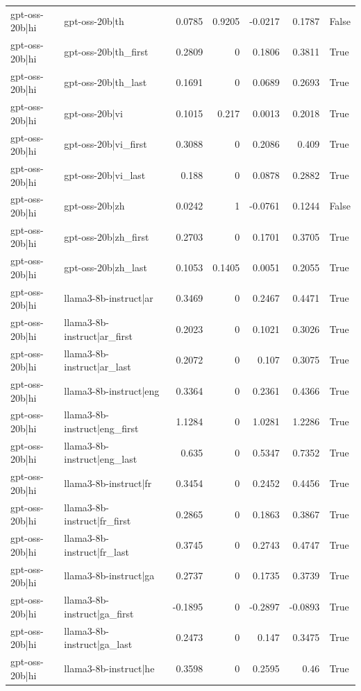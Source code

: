 \begin{table}
\begin{tabular}{l l r r r r l}
gpt-oss-20b|hi & gpt-oss-20b|th & 0.0785 & 0.9205 & -0.0217 & 0.1787 & False \\
gpt-oss-20b|hi & gpt-oss-20b|th_first & 0.2809 & 0 & 0.1806 & 0.3811 & True \\
gpt-oss-20b|hi & gpt-oss-20b|th_last & 0.1691 & 0 & 0.0689 & 0.2693 & True \\
gpt-oss-20b|hi & gpt-oss-20b|vi & 0.1015 & 0.217 & 0.0013 & 0.2018 & True \\
gpt-oss-20b|hi & gpt-oss-20b|vi_first & 0.3088 & 0 & 0.2086 & 0.409 & True \\
gpt-oss-20b|hi & gpt-oss-20b|vi_last & 0.188 & 0 & 0.0878 & 0.2882 & True \\
gpt-oss-20b|hi & gpt-oss-20b|zh & 0.0242 & 1 & -0.0761 & 0.1244 & False \\
gpt-oss-20b|hi & gpt-oss-20b|zh_first & 0.2703 & 0 & 0.1701 & 0.3705 & True \\
gpt-oss-20b|hi & gpt-oss-20b|zh_last & 0.1053 & 0.1405 & 0.0051 & 0.2055 & True \\
gpt-oss-20b|hi & llama3-8b-instruct|ar & 0.3469 & 0 & 0.2467 & 0.4471 & True \\
gpt-oss-20b|hi & llama3-8b-instruct|ar_first & 0.2023 & 0 & 0.1021 & 0.3026 & True \\
gpt-oss-20b|hi & llama3-8b-instruct|ar_last & 0.2072 & 0 & 0.107 & 0.3075 & True \\
gpt-oss-20b|hi & llama3-8b-instruct|eng & 0.3364 & 0 & 0.2361 & 0.4366 & True \\
gpt-oss-20b|hi & llama3-8b-instruct|eng_first & 1.1284 & 0 & 1.0281 & 1.2286 & True \\
gpt-oss-20b|hi & llama3-8b-instruct|eng_last & 0.635 & 0 & 0.5347 & 0.7352 & True \\
gpt-oss-20b|hi & llama3-8b-instruct|fr & 0.3454 & 0 & 0.2452 & 0.4456 & True \\
gpt-oss-20b|hi & llama3-8b-instruct|fr_first & 0.2865 & 0 & 0.1863 & 0.3867 & True \\
gpt-oss-20b|hi & llama3-8b-instruct|fr_last & 0.3745 & 0 & 0.2743 & 0.4747 & True \\
gpt-oss-20b|hi & llama3-8b-instruct|ga & 0.2737 & 0 & 0.1735 & 0.3739 & True \\
gpt-oss-20b|hi & llama3-8b-instruct|ga_first & -0.1895 & 0 & -0.2897 & -0.0893 & True \\
gpt-oss-20b|hi & llama3-8b-instruct|ga_last & 0.2473 & 0 & 0.147 & 0.3475 & True \\
gpt-oss-20b|hi & llama3-8b-instruct|he & 0.3598 & 0 & 0.2595 & 0.46 & True \\

\end{tabular}
\end{table}
